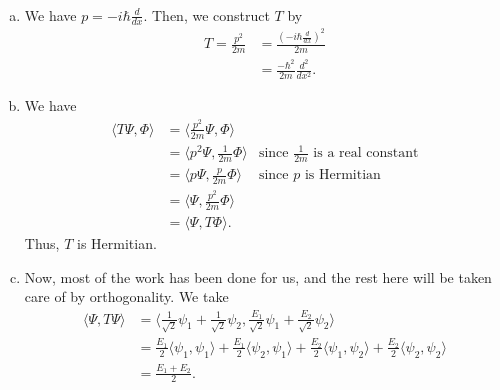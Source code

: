\documentclass[12pt]{article} %
\newcommand{\innprod}[2]{\langle #1, #2 \rangle}
\begin{document}
\begin{solution}~
	\begin{enumerate}[(a)]
		\item We have $p=-i\hbar \frac{d}{dx}$. Then, we construct $T$ by
		\begin{align*}
		T=\frac{p^2}{2m} &= \frac{\left(-i\hbar \frac{d}{dx}\right)^2}{2m}\\
		&= \frac{-\hbar^2}{2m}\frac{d^2}{dx^2}.
		\end{align*}
		
		\item We have
		\begin{align*}
		\innprod{T\Psi}{\Phi} &= \innprod{\frac{p^2}{2m}\Psi}{\Phi}\\
		&= \innprod{p^2 \Psi}{\frac{1}{2m}\Phi} &\textrm{since $\frac{1}{2m}$ is a real constant}\\
		&= \innprod{p\Psi}{\frac{p}{2m} \Phi} & \textrm{since $p$ is Hermitian}\\
		&= \innprod{\Psi}{\frac{p^2}{2m} \Phi}\\
		&= \innprod{\Psi}{T\Phi}.
		\end{align*}
		Thus, $T$ is Hermitian.
		
		
		\item Now, most of the work has been done for us, and the rest here will be taken care of by orthogonality.  We take
		\begin{align*}
			\innprod{\Psi}{T\Psi} &= \innprod{\frac{1}{\sqrt{2}} \psi_1 + \frac{1}{\sqrt{2}} \psi_2}{\frac{E_1}{\sqrt{2}}\psi_1 + \frac{E_2}{\sqrt{2}}\psi_2}\\
			&= \frac{E_1}{2} \innprod{\psi_1}{\psi_1} + \frac{E_1}{2}\innprod{\psi_2}{\psi_1}+\frac{E_2}{2}\innprod{\psi_1}{\psi_2} + \frac{E_2}{2} \innprod{\psi_2}{\psi_2}\\
			&= \frac{E_1+E_2}{2}.
		\end{align*}
	\end{enumerate}
\end{solution}
\end{document}

